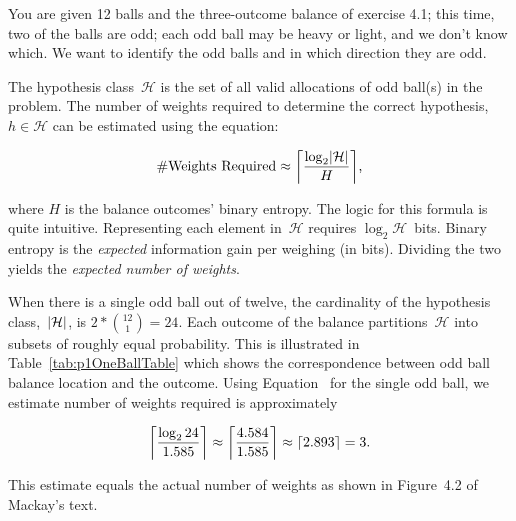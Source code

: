 \begin{problem}{4}{14}
  You are given 12 balls and the three-outcome balance of exercise 4.1; this time, two of the balls are odd; each odd ball may be heavy or light, and we don't know which.  We want to identify the odd balls and in which direction they are odd.
\end{problem}

  The hypothesis class~$\mathcal{H}$ is the set of all valid allocations of odd ball(s) in the problem. The number of weights required to determine the correct hypothesis,~$h\in\mathcal{H}$ can be estimated using the equation:

  \begin{equation}\label{eq:p1NumbWeightsRequired}
    \#\text{Weights Required} \approx \ceil*{\frac{\log_{2} \abs{\mathcal{H}}}{H}} \text{,}
  \end{equation}

  \noindent
  where $H$ is the balance outcomes' binary entropy.  The logic for this formula is quite intuitive. Representing each element in~$\mathcal{H}$ requires ${\log_{2}\mathcal{H}}$~bits.  Binary entropy is the \textit{expected} information gain per weighing (in bits).  Dividing the two yields the \textit{expected number of weights}.

  When there is a single odd ball out of twelve, the cardinality of the hypothesis class,~$\abs{\mathcal{H}}$, is ${2 * \binom{12}{1} = 24}$. Each outcome of the balance partitions~$\mathcal{H}$ into subsets of roughly equal probability. This is illustrated in Table~\ref{tab:p1OneBallTable} which shows the correspondence between odd ball balance location and the outcome. Using Equation~ for the single odd ball, we estimate number of weights required is approximately

  \[ \ceil*{\frac{\log_{2}24}{1.585}} \approx \ceil*{\frac{4.584}{1.585}} \approx \ceil{2.893} = 3 \text{.} \]

  \noindent
  This estimate equals the actual number of weights as shown in Figure~4.2 of Mackay's text.

